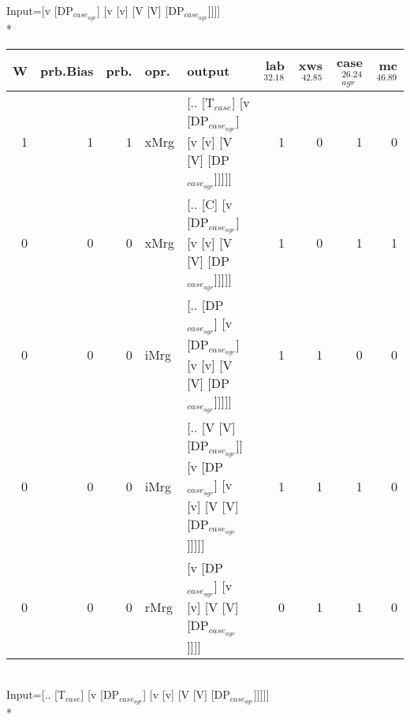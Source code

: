 \begingroup\scriptsize Input=[v [DP$_{case_{agr}}$] [v [v] [V [V] [DP$_{case_{agr}}$]]]]\\*
\begin{tabularx}{\linewidth}{rrrlXrrrr}
\hline
   W &   prb.Bias &   prb. & opr.   & output                                                                     &   lab$^{32.18}$ &   xws$^{42.85}$ &   case$_{agr}^{26.24}$ &   mc$^{46.89}$ \\
\hline
   1 &       1 &   1 & xMrg & [.. [T$_{case}$] [v [DP$_{case_{agr}}$] [v [v] [V [V] [DP$_{case_{agr}}$]]]]]              &             1 &             0 &                  1 &            0 \\
   0 &       0 &   0 & xMrg & [.. [C] [v [DP$_{case_{agr}}$] [v [v] [V [V] [DP$_{case_{agr}}$]]]]]                   &             1 &             0 &                  1 &            1 \\
   0 &       0 &   0 & iMrg & [.. [DP$_{case_{agr}}$] [v [DP$_{case_{agr}}$] [v [v] [V [V] [DP$_{case_{agr}}$]]]]]         &             1 &             1 &                  0 &            0 \\
   0 &       0 &   0 & iMrg & [.. [V [V] [DP$_{case_{agr}}$]] [v [DP$_{case_{agr}}$] [v [v] [V [V] [DP$_{case_{agr}}$]]]]] &             1 &             1 &                  1 &            0 \\
   0 &       0 &   0 & rMrg & [v [DP$_{case_{agr}}$] [v [v] [V [V] [DP$_{case_{agr}}$]]]]                            &             0 &             1 &                  1 &            0 \\
\hline
\end{tabularx}\endgroup\\
\begingroup\scriptsize Input=[.. [T$_{case}$] [v [DP$_{case_{agr}}$] [v [v] [V [V] [DP$_{case_{agr}}$]]]]]\\*
